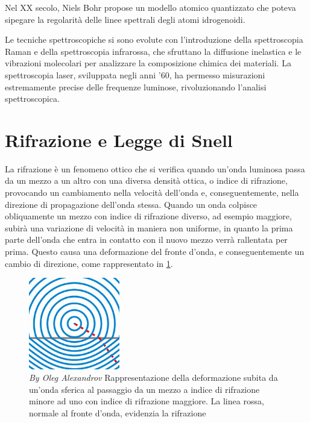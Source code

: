 \documentclass[12pt,a4paper]{report}
\begin{document}
Nel XX secolo, Niels Bohr propose un modello atomico quantizzato che poteva sipegare la regolarità delle linee spettrali degli atomi idrogenoidi\cite{Bohr1913}.

Le tecniche spettroscopiche si sono evolute con l'introduzione della spettroscopia Raman e della spettroscopia infrarossa, che sfruttano la diffusione inelastica e le vibrazioni molecolari per analizzare la composizione chimica dei materiali. La spettroscopia laser, sviluppata negli anni '60, ha permesso misurazioni estremamente precise delle frequenze luminose, rivoluzionando l'analisi spettroscopica.

\section{Rifrazione e Legge di Snell}

La rifrazione è un fenomeno ottico che si verifica quando un'onda luminosa passa da un mezzo a un altro con una diversa densità ottica, o indice di rifrazione, provocando un cambiamento nella velocità dell'onda e, conseguentemente, nella direzione di propagazione dell'onda stessa. Quando un onda colpisce obliquamente un mezzo con indice di rifrazione diverso, ad esempio maggiore, subirà una variazione di velocità in maniera non uniforme, in quanto la prima parte dell'onda che entra in contatto con il nuovo mezzo verrà rallentata per prima. Questo causa una deformazione del fronte d'onda, e conseguentemente un cambio di direzione, come rappresentato in \cref{fig:wawefrontRefraction}.

\begin{figure}[!ht]
    \centering
    \includegraphics[width=150px]{Immagini/Snells_law_wavefronts.png}
    \captionsetup{width=.8\linewidth}
    \caption[\textit{By Oleg Alexandrov}]{\textit{By Oleg Alexandrov\footnotemark} Rappresentazione della deformazione subita da un'onda sferica al passaggio da un mezzo a indice di rifrazione minore ad uno con indice di rifrazione maggiore. La linea rossa, normale al fronte d'onda, evidenzia la rifrazione}
    \label{fig:wawefrontRefraction}
\end{figure}
\end{document}
